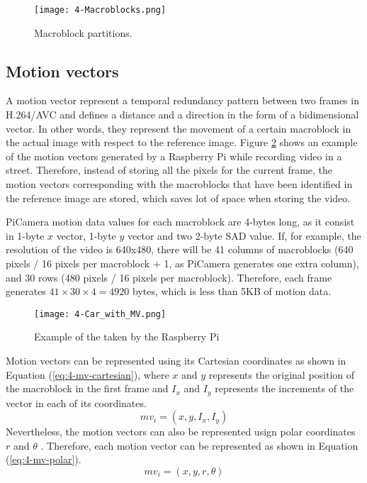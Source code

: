 \begin{figure}[!h]
	\begin{center}
		\texttt{[image: 4-Macroblocks.png]}
		\caption{Macroblock partitions.}
		\label{fig:4-Macroblocks}
	\end{center}
\end{figure}


\subsection{Motion vectors}
A motion vector represent a temporal redundancy pattern between two frames in H.264/AVC and defines a distance and a direction in the form of a bidimensional vector. In other words, they represent the movement of a certain macroblock in the actual image with respect to the reference image. Figure \ref{fig:4-Car_with_MV} shows an example of the motion vectors generated by a Raspberry Pi while recording video in a street. Therefore, instead of storing all the pixels for the current frame, the motion vectors corresponding with the macroblocks that have been identified in the reference image are stored, which saves lot of space when storing the video.

PiCamera motion data values for each macroblock are 4-bytes long, as it consist in 1-byte $x$ vector, 1-byte $y$ vector and two 2-byte \ac{SAD} value. If, for example, the resolution of the video is 640x480, there will be 41 columns of macroblocks (640 pixels / 16 pixels per macroblock + 1, as PiCamera generates one extra column), and 30 rows (480 pixels / 16 pixels per macroblock). Therefore, each frame generates $41\times30\times4 = 4920$ bytes, which is less than 5KB of motion data.

\begin{figure}[!h]
	\begin{center}
		\texttt{[image: 4-Car\_with\_MV.png]}
		\caption{Example of  the  taken by the Raspberry Pi}
		\label{fig:4-Car_with_MV}
	\end{center}
\end{figure}

Motion vectors can be represented using its Cartesian coordinates as shown in Equation (\ref{eq:4-mv-cartesian}), where $x$ and $y$ represents the original position of the macroblock in the first frame and $I_{x}$ and $I_{y}$ represents the increments of the vector in each of its coordinates.
\begin{equation} \label{eq:4-mv-cartesian}
mv_{i} = (x, y, I_{x}, I_{y})
\end{equation}
Nevertheless, the motion vectors can also be represented usign polar coordinates $r$ and $\theta$ \cite{GRMSJ12}. Therefore, each motion vector can be represented as shown in Equation (\ref{eq:4-mv-polar}).
\begin{equation} \label{eq:4-mv-polar}
mv_{i} = (x, y, r, \theta)
\end{equation}

